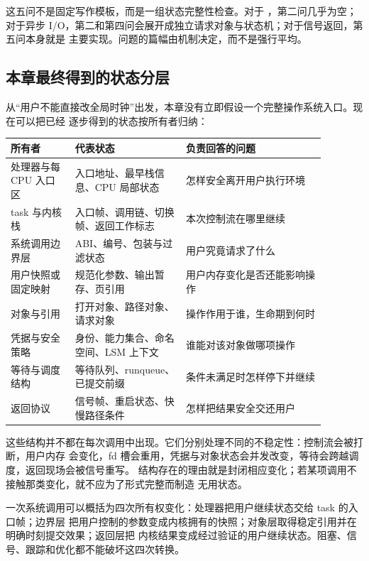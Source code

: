这五问不是固定写作模板，而是一组状态完整性检查。对于 ，第二问几乎为空；
对于异步 I/O，第二和第四问会展开成独立请求对象与状态机；对于信号返回，第五问本身就是
主要实现。问题的篇幅由机制决定，而不是强行平均。

\subsection{本章最终得到的状态分层}

从“用户不能直接改全局时钟”出发，本章没有立即假设一个完整操作系统入口。现在可以把已经
逐步得到的状态按所有者归纳：

\begin{longtable}{|L{0.18\linewidth}|L{0.31\linewidth}|L{0.39\linewidth}|}
\hline
所有者 & 代表状态 & 负责回答的问题 \\ \hline
处理器与每 CPU 入口区 & 入口地址、最早栈信息、CPU 局部状态 & 怎样安全离开用户执行环境 \\ \hline
task 与内核栈 & 入口帧、调用链、切换帧、返回工作标志 & 本次控制流在哪里继续 \\ \hline
系统调用边界层 & ABI、编号、包装与过滤状态 & 用户究竟请求了什么 \\ \hline
用户快照或固定映射 & 规范化参数、输出暂存、页引用 & 用户内存变化是否还能影响操作 \\ \hline
对象与引用 & 打开对象、路径对象、请求对象 & 操作作用于谁，生命期到何时 \\ \hline
凭据与安全策略 & 身份、能力集合、命名空间、LSM 上下文 & 谁能对该对象做哪项操作 \\ \hline
等待与调度结构 & 等待队列、runqueue、已提交前缀 & 条件未满足时怎样停下并继续 \\ \hline
返回协议 & 信号帧、重启状态、快慢路径条件 & 怎样把结果安全交还用户 \\ \hline
\end{longtable}

这些结构并不都在每次调用中出现。它们分别处理不同的不稳定性：控制流会被打断，用户内存
会变化，fd 槽会重用，凭据与对象状态会并发改变，等待会跨越调度，返回现场会被信号重写。
结构存在的理由就是封闭相应变化；若某项调用不接触那类变化，就不应为了形式完整而制造
无用状态。

\begin{keyidea}
一次系统调用可以概括为四次所有权变化：处理器把用户继续状态交给 task 的入口帧；边界层
把用户控制的参数变成内核拥有的快照；对象层取得稳定引用并在明确时刻提交效果；返回层把
内核结果变成经过验证的用户继续状态。阻塞、信号、跟踪和优化都不能破坏这四次转换。
\end{keyidea}
